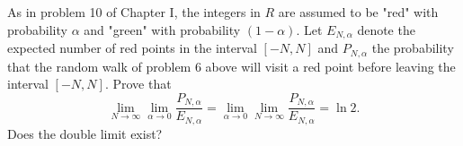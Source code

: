 As in problem 10 of Chapter I, the integers in \(R\) are assumed to be "red" with probability \(\alpha\) and "green" with probability \((1 - \alpha)\). Let \(E_{N,\alpha}\) denote the expected number of red points in the interval \([-N,N]\) and \(P_{N,\alpha}\) the probability that the random walk of problem 6 above will visit a red point before leaving the interval \([-N,N]\). Prove that
\[
\lim_{N \to \infty} \lim_{\alpha \to 0} \frac{P_{N,\alpha}}{E_{N,\alpha}} = \lim_{\alpha \to 0} \lim_{N \to \infty} \frac{P_{N,\alpha}}{E_{N,\alpha}} = \ln 2.
\]
Does the double limit exist?
